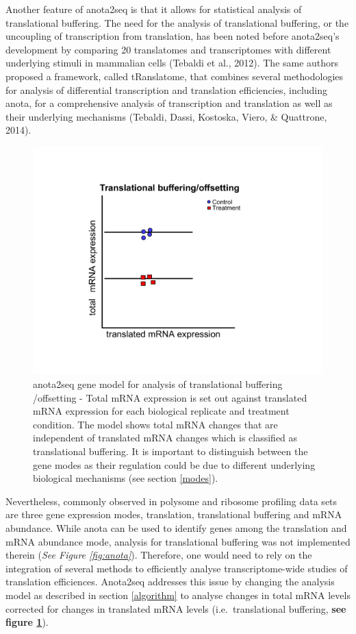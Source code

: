 \documentclass[12pt,openany]{book}
\begin{document}
Another feature of anota2seq is that it allows for statistical analysis
of translational buffering. The need for the analysis of translational
buffering, or the uncoupling of transcription from translation, has been
noted before anota2seq's development by comparing 20 translatomes and
transcriptomes with different underlying stimuli in mammalian cells
(Tebaldi et al., 2012). The same authors proposed a framework, called
tRanslatome, that combines several methodologies for analysis of
differential transcription and translation efficiencies, including
anota, for a comprehensive analysis of transcription and translation as
well as their underlying mechanisms (Tebaldi, Dassi, Kostoska, Viero, \&
Quattrone, 2014).

\begin{figure}
  \includegraphics{./figures/geneModes_anota2seq.pdf}
  \caption{anota2seq gene model for analysis of translational buffering /offsetting - Total mRNA expression is set out against translated mRNA expression for each biological replicate and treatment condition. The model shows total mRNA changes that are independent of translated mRNA changes which is classified as translational buffering. It is important to distinguish between the gene modes as their regulation could be due to different underlying biological mechanisms (see section \ref{modes}).
  \label{fig:anota2seq}}
\end{figure}

Nevertheless, commonly observed in polysome and ribosome profiling data
sets are three gene expression modes, translation, translational
buffering and mRNA abundance. While anota can be used to identify genes
among the translation and mRNA abundance mode, analysis for
translational buffering was not implemented therein (\emph{See Figure
\ref{fig:anota}}). Therefore, one would need to rely on the integration
of several methods to efficiently analyse transcriptome-wide studies of
translation efficiences. Anota2seq addresses this issue by changing the
analysis model as described in section \ref{algorithm} to analyse
changes in total mRNA levels corrected for changes in translated mRNA
levels (i.e.~translational buffering, \textbf{see figure
\ref{fig:anota2seq}}).
\end{document}
